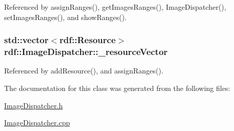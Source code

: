 Referenced by assign\+Ranges(), get\+Images\+Ranges(), Image\+Dispatcher(), set\+Images\+Ranges(), and show\+Ranges().

\subsubsection[{\texorpdfstring{\+\_\+resource\+Vector}{_resourceVector}}]{\setlength{\rightskip}{0pt plus 5cm}std\+::vector$<${\bf rdf\+::\+Resource}$>$ rdf\+::\+Image\+Dispatcher\+::\+\_\+resource\+Vector\hspace{0.3cm}{\ttfamily [private]}}\hypertarget{classrdf_1_1ImageDispatcher_aee49acec382a35bd2043e14f56dce8b1}{}\label{classrdf_1_1ImageDispatcher_aee49acec382a35bd2043e14f56dce8b1}


Referenced by add\+Resource(), and assign\+Ranges().



The documentation for this class was generated from the following files\+:\begin{DoxyCompactItemize}
\item 
\hyperlink{ImageDispatcher_8h}{Image\+Dispatcher.\+h}\item 
\hyperlink{ImageDispatcher_8cpp}{Image\+Dispatcher.\+cpp}\end{DoxyCompactItemize}
